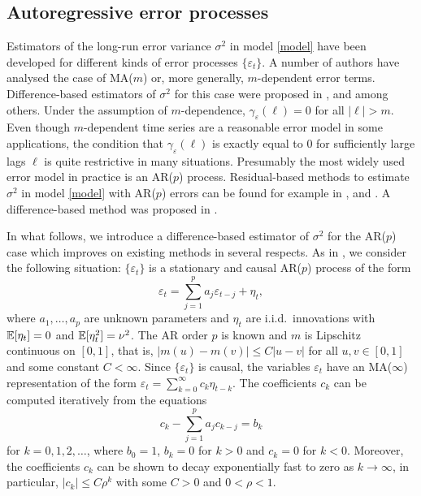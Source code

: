 \subsection{Autoregressive error processes}\label{subsec-error-var-AR}


Estimators of the long-run error variance $\sigma^2$ in model \eqref{model} have been developed for different kinds of error processes $\{\varepsilon_t\}$. A number of authors have analysed the case of MA($m$) or, more generally, $m$-dependent error terms. Difference-based estimators of $\sigma^2$ for this case were proposed in \cite{MuellerStadtmueller1988}, \cite{Herrmann1992} and \cite{Munk2017} among others. Under the assumption of $m$-dependence, $\gamma_\varepsilon(\ell) = 0$ for all $|\ell| > m$. Even though $m$-dependent time series are a reasonable error model in some applications, the condition that $\gamma_\varepsilon(\ell)$ is exactly equal to $0$ for sufficiently large lags $\ell$ is quite restrictive in many situations. Presumably the most widely used error model in practice is an AR($p$) process. Residual-based methods to estimate $\sigma^2$ in model \eqref{model} with AR($p$) errors can be found for example in \cite{Truong1991}, \cite{ShaoYang2011} and \cite{QiuShaoYang2013}. A difference-based method was proposed in \cite{Hall2003}. 


In what follows, we introduce a difference-based estimator of $\sigma^2$ for the AR($p$) case which improves on existing methods in several respects. As in \cite{Hall2003}, we consider the following situation: $\{\varepsilon_t\}$ is a stationary and causal AR($p$) process of the form 
\begin{equation}\label{AR-errors} 
\varepsilon_t = \sum_{j=1}^p a_j \varepsilon_{t-j} + \eta_t, 
\end{equation} 
where $a_1,\ldots,a_p$ are unknown parameters and $\eta_t$ are i.i.d.\ innovations with $\mathbb{E}[\eta_t] = 0$ and $\mathbb{E}[\eta_t^2] = \nu^2$. The AR order $p$ is known and $m$ is Lipschitz continuous on $[0,1]$, that is, $|m(u) - m(v)| \le C|u-v|$ for all $u,v \in [0,1]$ and some constant $C < \infty$. Since $\{\varepsilon_t\}$ is causal, the variables $\varepsilon_t$ have an MA($\infty$) representation of the form $\varepsilon_t =  \sum_{k=0}^\infty c_k \eta_{t-k}$. The coefficients $c_k$ can be computed iteratively from the equations 
\begin{equation}\label{c-recursion}
c_k - \sum_{j=1}^p a_j c_{k-j} = b_k 
\end{equation}
for $k = 0,1,2,\ldots$, where $b_0 = 1$, $b_k = 0$ for $k > 0$ and $c_k = 0$ for $ k < 0$. Moreover, the coefficients $c_k$ can be shown to decay exponentially fast to zero as $k \rightarrow \infty$, in particular, $|c_k| \le C \rho^k$ with some $C > 0$ and $0 < \rho < 1$. 


